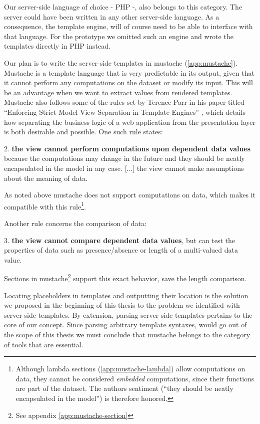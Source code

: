 \documentclass[thesis.tex]{subfiles}
\begin{document}
Our server-side language of choice - PHP -, also belongs to this category.
The server could have been written in any other server-side language.
As a consequence, the template engine, will of course need to be
able to interface with that language. For the prototype we omitted such an
engine and wrote the templates directly in PHP instead.

Our plan is to write the server-side templates in mustache
(\ref{app:mustache}). Mustache is a template language that is very
predictable in its output, given that it cannot perform any computations on the
dataset or modify its input. This will be an advantage when we want to extract
values from rendered templates. Mustache also follows some of the rules set by
Terence Parr in his paper titled ``Enforcing Strict Model-View Separation in
Template Engines'' \cite{STRINGTPL}, which details how separating the
business-logic of a web application from the presentation layer is both
desirable and possible. One such rule states:
\begin{citequote}{\cite[Chapter 7]{STRINGTPL}}
	2. \textbf{the view cannot perform computations upon dependent data values}
	because the computations may change in the future and
	they should be neatly encapsulated in the model in any case.
	[...] the view cannot make assumptions about the meaning of data.
\end{citequote}
As noted above mustache does not support computations on data, which makes it
compatible with this rule\footnote{Although lambda sections
(\ref{app:mustache-lambda}) allow computations on data,
they cannot be considered \emph{embedded} computations,
since their functions are part of the dataset.
The authors sentiment (``they should be neatly encapsulated in the model'')
is therefore honored.}.

Another rule concerns the comparison of data:
\begin{citequote}{\cite[Chapter 7]{STRINGTPL}}
	3. \textbf{the view cannot compare dependent data values},
	but can test the properties of data such as presence/absence
	or length of a multi-valued data value.
\end{citequote}
Sections in mustache\footnote{See appendix \ref{app:mustache-section}} support
this exact behavior, save the length comparison.

Locating placeholders in templates and outputting their location is the solution
we proposed in the beginning of this thesis to the problem we identified with
server-side templates.
By extension, parsing server-side templates pertains to the core of our concept.
Since parsing arbitrary template syntaxes, would go out of the scope of this
thesis we must conclude that mustache belongs to the category of tools that
are essential.
\end{document}
